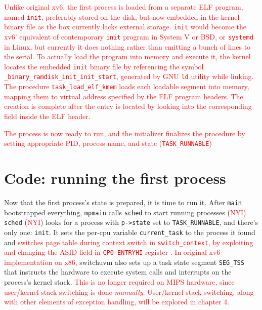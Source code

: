 \documentclass{report}
\def \hilite#1{\textcolor{red}{#1}}
\begin{document}
	\textcolor{red}{
		Unlike original xv6, the first process is loaded from a separate ELF program, named \texttt{init},
		preferably stored on the disk, but now embedded in the kernel binary file as the box currently lacks
		external storage.
		\texttt{init} would become the xv6' equivalent of contemporary \texttt{init}
		program in System V or BSD, or \texttt{systemd} in Linux, but currently it does nothing rather than
		emitting a bunch of lines to the serial.
		\marginpar{
			\footnotesize\ttfamily
			\textcolor{red}{ramdisk/init/init.c}
		}
		To actually load the program into memory and execute it, the kernel locates the embedded
		\texttt{init} binary file by referencing the symbol \texttt{\_binary\_ramdisk\_init\_init\_start},
		\marginpar{
			\footnotesize\ttfamily
			\textcolor{red}{kern/sched/task.c:113}
		}
		generated by GNU \texttt{ld} utility while linking.  The procedure \texttt{task\_load\_elf\_kmem}
		\marginpar{
			\footnotesize\ttfamily
			\textcolor{red}{kern/syscall/\\execve.c:118}
		}
		loads each loadable segment into memory, mapping them to virtual address specified by the ELF
		program headers.  The creation is complete after the entry is located by looking into the
		corresponding field inside the ELF header.
	}
	
	\textcolor{red}{
		The process is now ready to run, and the initializer finalizes the procedure by setting appropriate
		PID, process name, and state (\texttt{TASK\_RUNNABLE})
	}
	
	\section{Code: running the first process}
	Now that the first process's state is prepared, it is time to run it. After \texttt{main} bootstrapped
	everything, \texttt{mpmain} calls \texttt{sched}
	\marginpar{
		\footnotesize\ttfamily
		\hilite{kern/sched/sched.c}
	} to start running processes (\hilite{NYI}). 
	\texttt{sched} (\hilite{NYI})
	looks for a process with \texttt{p->state} set to \texttt{TASK\_RUNNABLE}, and there’s only one:
	\texttt{init}. It
	sets the per-cpu variable \texttt{current\_task}
	\marginpar{
		\footnotesize\ttfamily
		\hilite{arch/mips/include/\\asm/thread\_info.h:47}
	}
	to the process it found and \hilite{
		switches page table during context switch in \texttt{switch\_context},
		\marginpar{
			\footnotesize\ttfamily
			\hilite{arch/mips/sched/switch.S}
		} by exploiting and changing the ASID field in \texttt{CP0\_ENTRYHI}
		register
	}. \hilite{In original xv6 implementation on x86,} switchuvm also sets up a task
	state segment \texttt{SEG\_TSS} that instructs the hardware to execute system calls and 
	interrupts on the process’s kernel stack. \hilite{
		This is no longer required on MIPS hardware, since user/kernel stack switching is done
		\emph{manually}.  User/kernel stack switching, along with other elements of exception
		handling, will be explored in chapter 4.
	}
	
\end{document}
